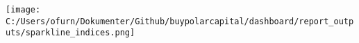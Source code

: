 \documentclass{article}
\begin{document}
\texttt{[image: C:/Users/ofurn/Dokumenter/Github/buypolarcapital/dashboard/report\_outputs/sparkline\_indices.png]}
\end{document}
